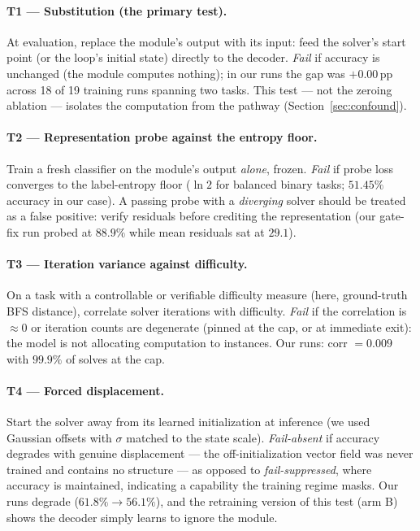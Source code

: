 \documentclass[11pt]{article}
\begin{document}
\paragraph{T1 --- Substitution (the primary test).} At evaluation,
replace the module's output with its input: feed the solver's start
point (or the loop's initial state) directly to the decoder.
\emph{Fail} if accuracy is unchanged (the module computes nothing);
in our runs the gap was $+0.00$\,pp across 18 of 19 training runs
spanning two tasks. This test --- not the zeroing ablation --- isolates
the computation from the pathway (Section~\ref{sec:confound}).

\paragraph{T2 --- Representation probe against the entropy floor.}
Train a fresh classifier on the module's output \emph{alone}, frozen.
\emph{Fail} if probe loss converges to the label-entropy floor
($\ln 2$ for balanced binary tasks; $51.45\%$ accuracy in our case).
A passing probe with a \emph{diverging} solver should be treated as a
false positive: verify residuals before crediting the representation
(our gate-fix run probed at $88.9\%$ while mean residuals sat at
$29.1$).

\paragraph{T3 --- Iteration variance against difficulty.} On a task
with a controllable or verifiable difficulty measure (here,
ground-truth BFS distance), correlate solver iterations with
difficulty. \emph{Fail} if the correlation is
$\approx 0$ or iteration counts are degenerate (pinned at the cap, or
at immediate exit): the model is not allocating computation to
instances. Our runs: corr $= 0.009$ with $99.9\%$ of solves at the
cap.

\paragraph{T4 --- Forced displacement.} Start the solver away from its
learned initialization at inference (we used Gaussian offsets with
$\sigma$ matched to the state scale). \emph{Fail-absent} if accuracy
degrades with genuine displacement --- the off-initialization vector
field was never trained and contains no structure --- as opposed to
\emph{fail-suppressed}, where accuracy is maintained, indicating a
capability the training regime masks. Our runs degrade
($61.8\%\!\to\!56.1\%$), and the retraining version of this test
(arm B) shows the decoder simply learns to ignore the module.
\end{document}
